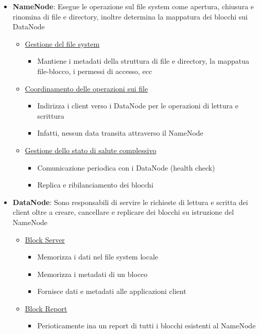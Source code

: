 \begin{itemize}
    \item \textbf{NameNode}: Esegue le operazione sul file system come apertura, chiusura e rinomina di file e directory, inoltre determina la mappatura dei blocchi sui DataNode
    \begin{itemize}
        \item \uline{Gestione del file system}
        \begin{itemize}
            \item Mantiene i metadati della struttura di file e directory, la mappatua file-blocco, i permessi di accesso, ecc
        \end{itemize}
        \item \uline{Coordinamento delle operazioni sui file}
        \begin{itemize}
            \item Indirizza i client verso i DataNode per le operazioni di lettura e scrittura
            \item Infatti, nessun data transita attraverso il NameNode
        \end{itemize}
        \item \uline{Gestione dello stato di salute complessivo}
        \begin{itemize}
            \item Comunicazione periodica con i DataNode (health check)
            \item Replica e ribilanciamento dei blocchi
        \end{itemize}
    \end{itemize}
    \item \textbf{DataNode}: Sono responsabili di servire le richieste di lettura e scritta dei client oltre a creare, cancellare e replicare dei blocchi su istruzione del NameNode
    \begin{itemize}
        \item \underline{Block Server}
        \begin{itemize}
            \item Memorizza i dati nel file system locale
            \item Memorizza i metadati di un blocco
            \item Fornisce dati e metadati alle applicazioni client
        \end{itemize}
        \item \uline{Block Report}
        \begin{itemize}
            \item Perioticamente ina un report di tutti i blocchi esistenti al NameNode
        \end{itemize}
    \end{itemize}
\end{itemize}

